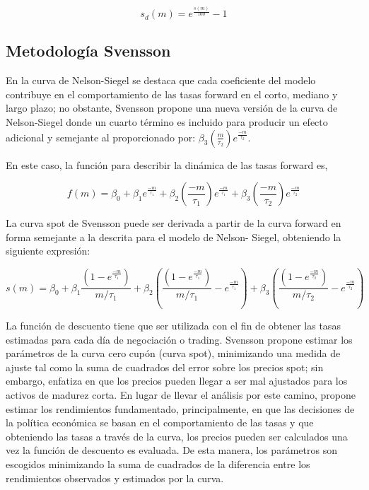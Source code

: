 \documentclass[
  12pt,
]{krantz}
\begin{document}
\[\displaystyle{s_{d}(m) = e^{\frac{s(m)}{100}} - 1}\]

\hypertarget{metodologia-svensson}{%
\subsection{Metodología Svensson}\label{metodologia-svensson}}

En la curva de Nelson-Siegel se destaca que cada coeficiente del modelo
contribuye en el comportamiento de las tasas forward en el corto,
mediano y largo plazo; no obstante, Svensson \cite{Sv} propone una nueva
versión de la curva de Nelson-Siegel donde un cuarto término es incluido
para producir un efecto adicional y semejante al proporcionado por:
\(\beta_{3}(\frac{m}{\tau_{2}})e^{\frac{-m}{\tau_{2}}}\).

En este caso, la función para describir la dinámica de las tasas forward es,

\[\displaystyle{f(m) = \beta_{0} + \beta_{1} e^{\frac{-m}{\tau_{1}}} +\beta_{2} \left(\frac{-m}{\tau_{1}}\right)e^{\frac{-m}{\tau_{1}}} + \beta_{3}\left(\frac{-m}{\tau_{2}}\right)e^{\frac{-m}{\tau_{2}}} }\]

La curva spot de Svensson puede ser derivada a partir de la curva
forward en forma semejante a la descrita para el modelo de Nelson-
Siegel, obteniendo la siguiente expresión:

\[\displaystyle{s(m) = \beta_{0}+ \beta_{1}\frac{\left(1-e^\frac{-m}{\tau_{1}}\right)}{m/\tau_{1}} + \beta_{2} \left(\frac{\left(1-e^\frac{-m}{\tau_{1}}\right)}{m/\tau_{1}} -  e^\frac{-m}{\tau_{1}}\right) + \beta_{3} \left(\frac{\left(1-e^\frac{-m}{\tau_{2}}\right)}{m/\tau_{2}} -  e^\frac{-m}{\tau_{2}}\right)}\]

La función de descuento tiene que ser utilizada con el fin de obtener las
tasas estimadas para cada día de negociación o trading. Svensson \cite{Sv}
propone estimar los parámetros de la curva cero cupón (curva spot),
minimizando una medida de ajuste tal como la suma de cuadrados del
error sobre los precios spot; sin embargo, enfatiza en que los precios
pueden llegar a ser mal ajustados para los activos de madurez corta. En
lugar de llevar el análisis por este camino, propone estimar los
rendimientos fundamentado, principalmente, en que las decisiones de la
política económica se basan en el comportamiento de las tasas y que
obteniendo las tasas a través de la curva, los precios pueden ser
calculados una vez la función de descuento es evaluada. De esta manera,
los parámetros son escogidos minimizando la suma de cuadrados de la
diferencia entre los rendimientos observados y estimados por la curva.
\end{document}
